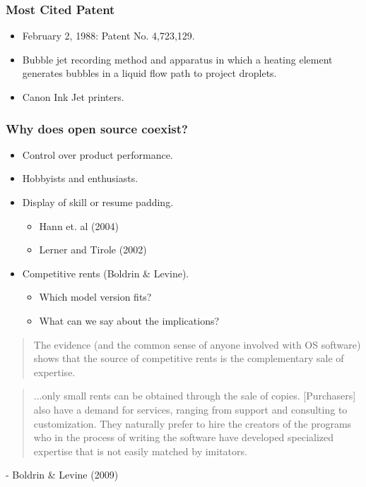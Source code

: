 \documentclass{beamer}
\begin{document}
\begin{frame}[t]\frametitle{Most Cited Patent} 
  \begin{itemize}
    \item February 2, 1988: Patent No. 4,723,129.
    \item Bubble jet recording method and apparatus in which a heating element generates bubbles in a liquid flow path to project droplets.
    \item Canon Ink Jet printers.
  \end{itemize}
\end{frame}
\begin{frame}[t]
  \frametitle{Why does open source coexist?}
  \begin{itemize}
    \item<+-> Control over product performance.
    \item<+-> Hobbyists and enthusiasts.
    \item<+-> Display of skill or resume padding. %
    \begin{itemize}
        \item<+-> Hann et. al (2004)
        \item<+-> Lerner and Tirole (2002)
    \end{itemize}
    \item<+-> Competitive rents (Boldrin \& Levine).
    \begin{itemize}
        \item<+-> Which model version fits?
        \item<+-> What can we say about the implications?
    \end{itemize}
  \end{itemize}
\end{frame}

\begin{frame}[t]
  \begin{quotation}
    The evidence (and the common sense of anyone involved with OS software) shows   that the source of competitive rents is the complementary sale of expertise.
  \end{quotation}
  \begin{quotation}
      ...only small rents can be obtained through the sale of copies. [Purchasers] also have a demand for services, ranging from support and consulting to customization. They naturally prefer to hire the creators of the programs who in the process of writing the software have developed specialized expertise that is not easily matched by imitators.
  \end{quotation}
  - Boldrin \& Levine (2009)
\end{frame}
\end{document}
